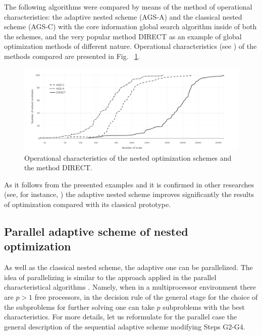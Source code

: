 The following algorithms were compared by means of the method of operational characteristics: the adaptive nested scheme (AGS-A) and the classical nested scheme (AGS-C) with the core information global search algorithm inside of both the schemes, and the very popular method DIRECT \cite{5_Jones, 5_JonesPerttunenStuckman} as an example of global optimization methods of different nature. 
Operational characteristics (see \cite{5_GrishaginOperChar, 5_GriKvaMukhStr, 5_StrSergMon2000}) of the methods compared are presented in Fig. ~\ref{fig:5_11}.
\begin{figure}[ht]
\centering
\includegraphics[width=1.0\linewidth]{figures/figure_5_11.pdf}
\caption{Operational characteristics of the nested optimization schemes and the method DIRECT.}
\label{fig:5_11}    
\end{figure}

As it follows from the presented examples and it is confirmed in other researches (see, for instance, \cite{5_GerGriGer, 5_GriIsrSergAIP, 5_GriIsrSergAMC}) the adaptive nested scheme improves significantly the results of optimization compared with its classical prototype. 

\subsection{Parallel adaptive scheme of nested optimization}
\label{subsec:5_4_3}
As well as the classical nested scheme, the adaptive one can be parallelized. The idea of parallelizing is similar to the approach applied in the parallel characteristical algorithms \cite{5_GrishaginSergeyevStrongin}. Namely, when in a multiprocessor environment there are $p>1$ free processors, in the decision rule of the general stage for the choice of the subproblems for further solving one can take $p$ subproblems with the best characteristics. For more details, let us reformulate for the parallel case the general description of the sequential adaptive scheme modifying Steps G2-G4.

